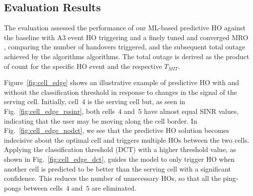 		\subsection{Evaluation Results}
		
			The evaluation assessed the performance of our \ac{ML}-based predictive \ac{HO} against the baseline with A3 event \ac{HO} triggering and a finely tuned and converged \ac{MRO} \cite{mrobeyonddoppler}, comparing the number of handovers triggered, and the subsequent total outage achieved by the algorithms algorithms.
			The total outage is derived as the product of count for the specific \ac{HO} event and the respective $T_{MIT}$.
			
			Figure~\ref{fig:cell_edge} shows an illustrative example of predictive \ac{HO} with and without the classification threshold in response to changes in the signal of the serving cell.
			Initially, cell~$4$ is the serving cell but, as seen in Fig.~\ref{fig:cell_edge_rssinr}, both cells~$4$ and~$5$ have almost equal \ac{SINR} values, indicating that the user may be moving along the cell border.
			In Fig.~\ref{fig:cell_edge_nodct}, we see that the predictive \ac{HO} solution becomes indecisive about the optimal cell and triggers multiple \acp{HO} between the two cells.
			Applying the classification threshold (\ac{DCT}) with a higher threshold value, as shown in Fig.~\ref{fig:cell_edge_dct}, guides the model to only trigger \ac{HO} when another cell is predicted to be better than the serving cell with a significant confidence.
			This reduces the number of unnecessary \acp{HO}, so that all the ping-pongs between cells~$4$ and~$5$ are eliminated.
			
